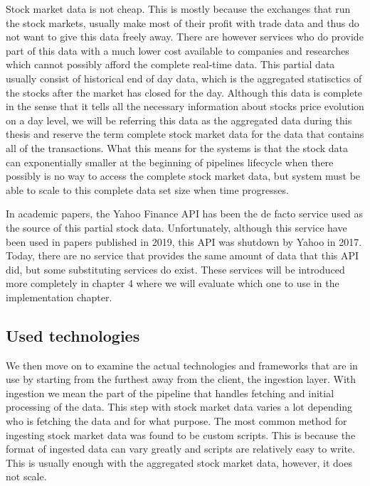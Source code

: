 Stock market data is not cheap.
This is mostly because the exchanges that run the stock markets, usually make most of their profit with trade data and thus do not want to give this data freely away.
There are however services who do provide part of this data with a much lower cost available to companies and researches which cannot possibly afford the complete real-time data.
This partial data usually consist of historical end of day data, which is the aggregated statisctics of the stocks after the market has closed for the day.
Although this data is complete in the sense that it tells all the necessary information about stocks price evolution on a day level, we will be referring this data as the aggregated data during this thesis and reserve the term complete stock market data for the data that contains all of the transactions.
What this means for the systems is that the stock data can exponentially smaller at the beginning of pipelines lifecycle when there possibly is no way to access the complete stock market data, but system must be able to scale to this complete data set size when time progresses.

In academic papers, the Yahoo Finance API has been the de facto service used as the source of this partial stock data. \cite{islam} \cite{adresic} \cite{le} \cite{serez}
Unfortunately, although this service have been used in papers published in 2019, this API was shutdown by Yahoo in 2017.
Today, there are no service that provides the same amount of data that this API did, but some substituting services do exist.\cite{lotter}
These services will be introduced more completely in chapter 4 where we will evaluate which one to use in the implementation chapter.

\subsection{Used technologies}

We then move on to examine the actual technologies and frameworks that are in use by starting from the furthest away from the client, the ingestion layer.
With ingestion we mean the part of the pipeline that handles fetching and initial processing of the data.
This step with stock market data varies a lot depending who is fetching the data and for what purpose.
The most common method for ingesting stock market data was found to be custom scripts.
This is because the format of ingested data can vary greatly and scripts are relatively easy to write.
This is usually enough with the aggregated stock market data, however, it does not scale.

